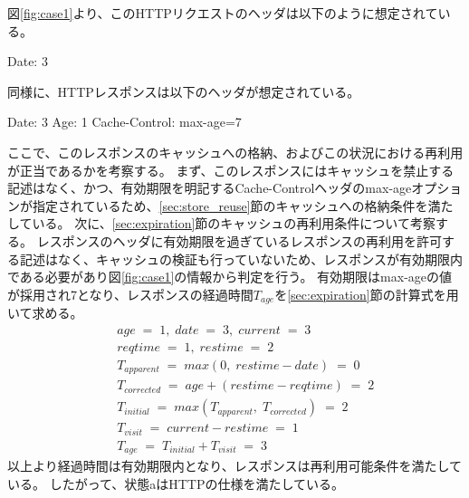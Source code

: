 \documentclass{css}
\begin{document}
図\ref{fig:case1}より、このHTTPリクエストのヘッダは以下のように想定されている。
\begin{verbatimtab}[4]
	Date: 3
\end{verbatimtab}
同様に、HTTPレスポンスは以下のヘッダが想定されている。
\begin{verbatimtab}[4]
	Date: 3
	Age: 1
	Cache-Control: max-age=7
\end{verbatimtab}
ここで、このレスポンスのキャッシュへの格納、およびこの状況における再利用が正当であるかを考察する。
まず、このレスポンスにはキャッシュを禁止する記述はなく、かつ、有効期限を明記するCache-Controlヘッダのmax-ageオプションが指定されているため、\ref{sec:store_reuse}節のキャッシュへの格納条件を満たしている。
次に、\ref{sec:expiration}節のキャッシュの再利用条件について考察する。
レスポンスのヘッダに有効期限を過ぎているレスポンスの再利用を許可する記述はなく、キャッシュの検証も行っていないため、レスポンスが有効期限内である必要があり図\ref{fig:case1}の情報から判定を行う。
有効期限はmax-ageの値が採用され7となり、レスポンスの経過時間$T_{age}$を\ref{sec:expiration}節の計算式を用いて求める。
\begin{eqnarray*}
&&age\;=\;1,\; date\;=\;3,\; current\;=\;3\\
&&reqtime\;=\;1,\; restime\;=\;2\\
&&T_{apparent}\;=\;max(0,\;restime - date)\;=\;0\\
&&T_{corrected}\;=\;age + (restime - reqtime)\;=\;2\\
&&T_{initial}\;=\;max(T_{apparent},\;T_{corrected})\;=\;2\\
&&T_{visit}\;=\;current - restime\;=\;1\\
&&T_{age}\;=\;T_{initial} + T_{visit}\;=\;3
\end{eqnarray*}
以上より経過時間は有効期限内となり、レスポンスは再利用可能条件を満たしている。
したがって、状態aはHTTPの仕様を満たしている。
\end{document}
